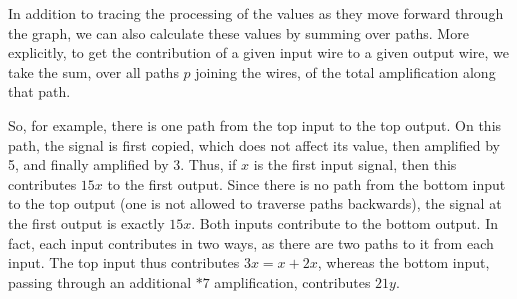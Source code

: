 \documentclass[7Sketches]{subfiles}
\begin{document}
In addition to tracing the processing of the values as they move forward through
the graph, we can also calculate these values by summing over paths. More
explicitly, to get the contribution of a given input wire to a given output
wire, we take the sum, over all paths $p$ joining the wires, of the total amplification along that
path.

So, for example, there is one path from the top input to the top output.
On this path, the signal is first copied, which does not affect its value, then
amplified by 5, and finally amplified by 3. Thus, if $x$ is the first input
signal, then this contributes $15x$ to the first output. Since there is no path
from the bottom input to the top output (one is not allowed to traverse paths
backwards), the signal at the first output is exactly $15x$. Both inputs contribute to the bottom output. In fact, each input contributes in
two ways, as there are two paths to it from each input. The top input thus
contributes $3x=x+2x$, whereas the bottom input, passing through an additional
$\ast 7$ amplification, contributes $21y$.
\end{document}
